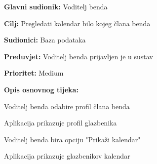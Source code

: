 \noindent {}
	\begin{packed_item}
		
		\item \textbf{Glavni sudionik:} Voditelj benda 
		\item \textbf{Cilj:} Pregledati kalendar bilo kojeg člana benda
		\item \textbf{Sudionici:} Baza podataka
		\item \textbf{Preduvjet:} Voditelj benda prijavljen je u sustav
		\item \textbf{Prioritet:} Medium
		\item \textbf{Opis osnovnog tijeka:} 
		
		\item[] \begin{packed_enum}
			
			\item Voditelj benda odabire profil člana benda
			\item Aplikacija prikazuje profil glazbenika
			\item Voditelj benda bira opciju "Prikaži kalendar"
			\item Aplikacija prikazuje glazbenikov kalendar
		\end{packed_enum}  
	\end{packed_item}

